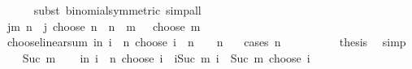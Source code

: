 \begin{isabellebody}
\ \ \ \ \isamarkupfalse%
\ {\isacharparenleft}{\kern0pt}subst\ binomial{\isacharunderscore}{\kern0pt}symmetric{\isacharparenright}{\kern0pt}\ simp{\isacharunderscore}{\kern0pt}all\isanewline
\ \ \isamarkupfalse%
\ \isamarkupfalse%
\ {\isachardoublequoteopen}{\isacharparenleft}{\kern0pt}{\isasymSum}j{\isasymle}m{\isachardot}{\kern0pt}\ {\isacharparenleft}{\kern0pt}{\isacharparenleft}{\kern0pt}n\ {\isacharplus}{\kern0pt}\ j{\isacharparenright}{\kern0pt}\ choose\ n{\isacharparenright}{\kern0pt}{\isacharparenright}{\kern0pt}\ {\isacharequal}{\kern0pt}\ {\isacharparenleft}{\kern0pt}n\ {\isacharplus}{\kern0pt}\ m\ {\isacharplus}{\kern0pt}\ {}{\isacharparenright}{\kern0pt}\ choose\ m{\isachardoublequoteclose}\ \isacommand{{\isachardot}{\kern0pt}}\isamarkupfalse%
\isanewline
{}\isamarkupfalse%
%
\endisatagproof
{\isafoldproof}%
%
\isadelimproof
\isanewline
%
\endisadelimproof
\isanewline
{}\isamarkupfalse%
\ choose{\isacharunderscore}{\kern0pt}linear{\isacharunderscore}{\kern0pt}sum{\isacharcolon}{\kern0pt}\ {\isachardoublequoteopen}{\isacharparenleft}{\kern0pt}{\isasymSum}i{\isasymle}n{\isachardot}{\kern0pt}\ i\ {\isacharasterisk}{\kern0pt}\ {\isacharparenleft}{\kern0pt}n\ choose\ i{\isacharparenright}{\kern0pt}{\isacharparenright}{\kern0pt}\ {\isacharequal}{\kern0pt}\ n\ {\isacharasterisk}{\kern0pt}\ {}\ {\isacharcircum}{\kern0pt}\ {\isacharparenleft}{\kern0pt}n\ {\isacharminus}{\kern0pt}\ {}{\isacharparenright}{\kern0pt}{\isachardoublequoteclose}\isanewline
%
\isadelimproof
%
\endisadelimproof
%
\isatagproof
{}\isamarkupfalse%
\ {\isacharparenleft}{\kern0pt}cases\ n{\isacharparenright}{\kern0pt}\isanewline
\ \ \isamarkupfalse%
\ {}\isanewline
\ \ \isamarkupfalse%
\ \isamarkupfalse%
\ {\isacharquery}{\kern0pt}thesis\ \isamarkupfalse%
\ simp\isanewline
{}\isamarkupfalse%
\isanewline
\ \ \isamarkupfalse%
\ {\isacharparenleft}{\kern0pt}Suc\ m{\isacharparenright}{\kern0pt}\isanewline
\ \ \isamarkupfalse%
\ {\isachardoublequoteopen}{\isacharparenleft}{\kern0pt}{\isasymSum}i{\isasymle}n{\isachardot}{\kern0pt}\ i\ {\isacharasterisk}{\kern0pt}\ {\isacharparenleft}{\kern0pt}n\ choose\ i{\isacharparenright}{\kern0pt}{\isacharparenright}{\kern0pt}\ {\isacharequal}{\kern0pt}\ {\isacharparenleft}{\kern0pt}{\isasymSum}i{\isasymle}Suc\ m{\isachardot}{\kern0pt}\ i\ {\isacharasterisk}{\kern0pt}\ {\isacharparenleft}{\kern0pt}Suc\ m\ choose\ i{\isacharparenright}{\kern0pt}{\isacharparenright}{\kern0pt}{\isachardoublequoteclose}\isanewline

\end{isabellebody}
